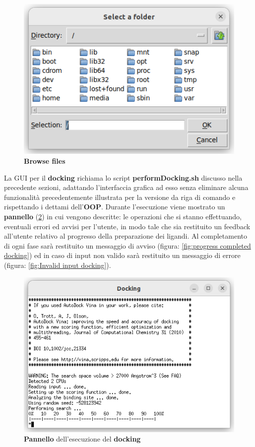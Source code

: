\begin{figure}[H]
    \centering
    \includegraphics{immagini/browseFoldersDocking.png}
    \caption{\textbf{Browse files}}
    \label{fig:browse folder docking}
\end{figure}

La GUI per il \textbf{docking} richiama lo script \textbf{performDocking.sh} discusso nella precedente sezioni, adattando l'interfaccia grafica ad esso senza eliminare alcuna funzionalità precedentemente illustrata per la versione da riga di comando e rispettando i dettami dell'\textbf{OOP}.\newline
Durante l'esecuzione viene mostrato un \textbf{pannello} (\ref{fig:docking execution}) in cui vengono descritte: le operazioni che si stanno effettuando, eventuali errori ed avvisi per l'utente, in modo tale che sia restituito un feedback all'utente relativo al progresso della preparazione dei ligandi. Al completamento di ogni fase sarà restituito un messaggio di avviso (figura: \ref{fig:progress completed docking}) ed in caso di input non valido sarà restituito un messaggio di errore (figura: \ref{fig:Invalid input docking}).

\begin{figure}[H]
    \centering
    \includegraphics[scale=0.8]{immagini/dockingExecute.png}
    \caption{\textbf{Pannello} dell'esecuzione del \textbf{docking}}
    \label{fig:docking execution}
\end{figure}

